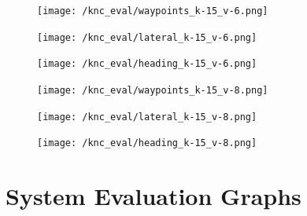 \documentclass[titlepage,draft]{article}
\begin{document}
{\begin{figure}[H]
	\centering
	\begin{minipage}{.45\textwidth}
		\centering
		\texttt{[image: /knc\_eval/waypoints\_k-15\_v-6.png]}
		\label{fig:wayk15v6}
	\end{minipage}%
	\hspace{0.1\textwidth}%
	\begin{minipage}{.45\textwidth}
		\centering
		\texttt{[image: /knc\_eval/lateral\_k-15\_v-6.png]}
		\label{fig:latk15v6}
	\end{minipage}
\end{figure}

\begin{figure}[H]
	\centering
	\begin{minipage}{.45\textwidth}
		\centering
		\texttt{[image: /knc\_eval/heading\_k-15\_v-6.png]}
		\label{fig:headk15v6}
	\end{minipage}%
	\hspace{0.1\textwidth}%
	\begin{minipage}{.45\textwidth}
		\centering
		\texttt{[image: /knc\_eval/waypoints\_k-15\_v-8.png]}
		\label{fig:wayk15v8}
	\end{minipage}
\end{figure}

\begin{figure}[H]
	\centering
	\begin{minipage}{.45\textwidth}
		\centering
		\texttt{[image: /knc\_eval/lateral\_k-15\_v-8.png]}
		\label{fig:latk15v8}
	\end{minipage}%
	\hspace{0.1\textwidth}%
	\begin{minipage}{.45\textwidth}
		\centering
		\texttt{[image: /knc\_eval/heading\_k-15\_v-8.png]}
		\label{fig:headk15v4}
	\end{minipage}
\end{figure}

\section{System Evaluation Graphs}
\label{SecondAppendix}

}
\end{document}
